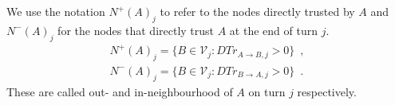 \begin{definition}[Neighbourhood]
  \label{neighbourhood}
  We use the notation $N^{+}\left(A\right)_j$ to refer to the nodes directly trusted by $A$ and $N^{-}\left(A\right)_j$ for
  the nodes that directly trust $A$ at the end of turn $j$.
    \begin{equation}
    \begin{gathered}
      N^{+}\left(A\right)_j = \{B \in \mathcal{V}_j : DTr_{A \rightarrow B, j} > 0\} \enspace, \\
      N^{-}\left(A\right)_j = \{B \in \mathcal{V}_j : DTr_{B \rightarrow A, j} > 0\} \enspace.
    \end{gathered}
    \end{equation}
    These are called out- and in-neighbourhood of $A$ on turn $j$ respectively.
\end{definition}
